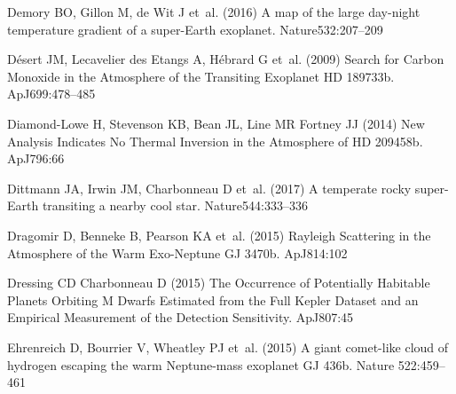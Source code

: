 \documentclass[graybox,natbib,nosecnum]{svmult}
\newcommand*\apj{ApJ}
\newcommand*\nat{Nature}
\begin{document}
\begin{thebibliography}{110}
{Demory} BO, {Gillon} M, {de Wit} J et~al. (2016) {A map of the large day-night
  temperature gradient of a super-Earth exoplanet}. \nat 532:207--209

{D{\'e}sert} JM, {Lecavelier des Etangs} A, {H{\'e}brard} G et~al. (2009)
  {Search for Carbon Monoxide in the Atmosphere of the Transiting Exoplanet HD
  189733b}. \apj 699:478--485

{Diamond-Lowe} H, {Stevenson} KB, {Bean} JL, {Line} MR {Fortney} JJ (2014) {New
  Analysis Indicates No Thermal Inversion in the Atmosphere of HD 209458b}.
  \apj 796:66

{Dittmann} JA, {Irwin} JM, {Charbonneau} D et~al. (2017) {A temperate rocky
  super-Earth transiting a nearby cool star}. \nat 544:333--336

{Dragomir} D, {Benneke} B, {Pearson} KA et~al. (2015) {Rayleigh Scattering in
  the Atmosphere of the Warm Exo-Neptune GJ 3470b}. \apj 814:102

{Dressing} CD {Charbonneau} D (2015) {The Occurrence of Potentially Habitable
  Planets Orbiting M Dwarfs Estimated from the Full Kepler Dataset and an
  Empirical Measurement of the Detection Sensitivity}. \apj 807:45

{Ehrenreich} D, {Bourrier} V, {Wheatley} PJ et~al. (2015) {A giant comet-like
  cloud of hydrogen escaping the warm Neptune-mass exoplanet GJ 436b}. \nat
  522:459--461


\end{thebibliography}
\end{document}
